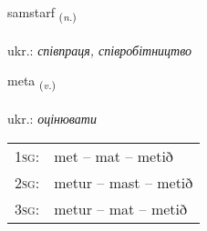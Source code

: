 \documentclass[frontgrid, backgrid]{flacards}\usepackage[]{graphicx}\usepackage[]{xcolor}
\begin{document}
\renewcommand{\flhead}{\vskip5pt \fboxsep=0pt {\small\bfseries\footnotesize Nafnorð | іменник}}
\renewcommand{\fcfoot}{\vskip5pt \fboxsep=0pt \hspace{2pt}{\small\bfseries\footnotesize 1K}}

\renewcommand{\blhead}{\vskip5pt {\small\bfseries\footnotesize Nafnorð | іменник }}
\renewcommand{\bcfoot}{\vskip5pt \hspace{2pt}{\small\bfseries\footnotesize 1K}}


{samstarf \small{\textsubscript{(\textit{n.})}} \\[1ex] %
\textphonetic{[samstarf]} \\
ukr.: \emph{співпраця, співробітництво} \\  [2ex]
\renewcommand*{\arraystretch}{0.8}
}

\renewcommand{\flhead}{\vskip5pt \fboxsep=0pt {\small\bfseries\footnotesize Sagnorð | дієслово}}
\renewcommand{\fcfoot}{\vskip5pt \fboxsep=0pt \hspace{2pt}{\small\bfseries\footnotesize 1K}}

\renewcommand{\blhead}{\vskip5pt {\small\bfseries\footnotesize Sagnorð | дієслово }}
\renewcommand{\bcfoot}{\vskip5pt \hspace{2pt}{\small\bfseries\footnotesize 1K}}


{meta \small{\textsubscript{(\textit{v.})}} \\[1ex] %
\textphonetic{[mɛːta]} \\
ukr.: \emph{оцінювати} \\  [2ex]
\renewcommand*{\arraystretch}{0.8}
\begin{tabular}{p{1cm}l}
\textsc{1sg}: & met -- mat -- metið \\ 
\textsc{2sg}: & metur -- mast -- metið \\ 
\textsc{3sg}: & metur -- mat -- metið \\ 
\end{tabular}
}
\end{document}
